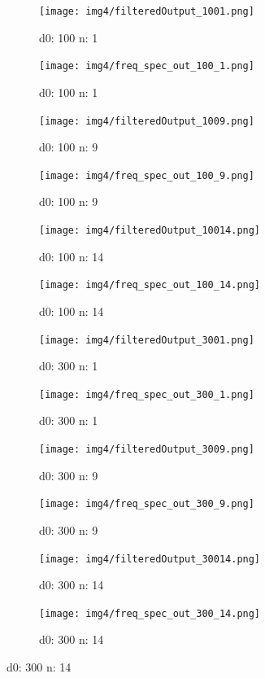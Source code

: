 \begin{figure}[H]
    \centering
    \begin{subfigure}[b]{0.16\textwidth}
        \texttt{[image: img4/filteredOutput\_1001.png]}
        \caption{d0: 100 n: 1}
        \label{fig:img4_1001_im}
    \end{subfigure}
    \begin{subfigure}[b]{0.1555\textwidth}
        \texttt{[image: img4/freq\_spec\_out\_100\_1.png]}
        \caption{d0: 100 n: 1}
        \label{fig:img4_1001_fr}
    \end{subfigure}
	 \begin{subfigure}[b]{0.16\textwidth}
        \texttt{[image: img4/filteredOutput\_1009.png]}
        \caption{d0: 100 n: 9}
        \label{fig:img4_1009_im}
    \end{subfigure}
    \begin{subfigure}[b]{0.1555\textwidth}
        \texttt{[image: img4/freq\_spec\_out\_100\_9.png]}
        \caption{d0: 100 n: 9}
        \label{fig:img4_1009_fr}
    \end{subfigure}	
\begin{subfigure}[b]{0.16\textwidth}
        \texttt{[image: img4/filteredOutput\_10014.png]}
        \caption{d0: 100 n: 14}
        \label{fig:img4_10014_im}
    \end{subfigure}
    \begin{subfigure}[b]{0.1555\textwidth}
        \texttt{[image: img4/freq\_spec\_out\_100\_14.png]}
        \caption{d0: 100 n: 14}
        \label{fig:img4_10014_fr}
    \end{subfigure}	
    
    
      \begin{subfigure}[b]{0.16\textwidth}
        \texttt{[image: img4/filteredOutput\_3001.png]}
        \caption{d0: 300 n: 1}
        \label{fig:img4_3001_im}
    \end{subfigure}
    \begin{subfigure}[b]{0.1555\textwidth}
        \texttt{[image: img4/freq\_spec\_out\_300\_1.png]}
        \caption{d0: 300 n: 1}
        \label{fig:img4_3001_fr}
    \end{subfigure}
	 \begin{subfigure}[b]{0.16\textwidth}
        \texttt{[image: img4/filteredOutput\_3009.png]}
        \caption{d0: 300 n: 9}
        \label{fig:img4_3009_im}
    \end{subfigure}
    \begin{subfigure}[b]{0.1555\textwidth}
        \texttt{[image: img4/freq\_spec\_out\_300\_9.png]}
        \caption{d0: 300 n: 9}
        \label{fig:img4_3009_fr}
    \end{subfigure}	
\begin{subfigure}[b]{0.16\textwidth}
        \texttt{[image: img4/filteredOutput\_30014.png]}
        \caption{d0: 300 n: 14}
        \label{fig:img4_30014_im}
    \end{subfigure}
    \begin{subfigure}[b]{0.1555\textwidth}
        \texttt{[image: img4/freq\_spec\_out\_300\_14.png]}
        \caption{d0: 300 n: 14}
        \label{fig:img4_30014_fr}
    \end{subfigure}
    

\end{figure}
